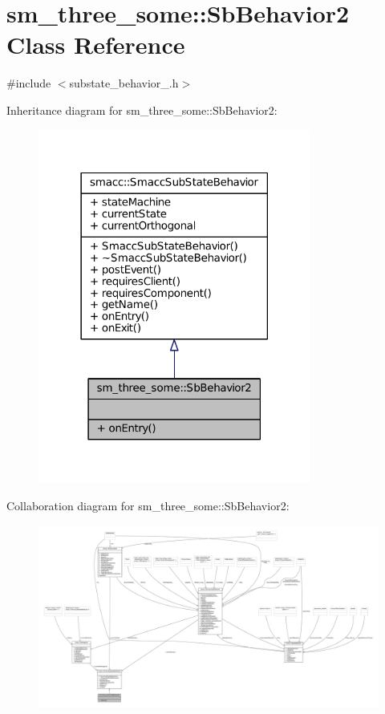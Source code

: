 \hypertarget{classsm__three__some_1_1SbBehavior2}{}\section{sm\+\_\+three\+\_\+some\+:\+:Sb\+Behavior2 Class Reference}
\label{classsm__three__some_1_1SbBehavior2}


{\ttfamily \#include $<$substate\+\_\+behavior\+\_.\+h$>$}



Inheritance diagram for sm\+\_\+three\+\_\+some\+:\+:Sb\+Behavior2\+:
\nopagebreak
\begin{figure}[H]
\begin{center}
\leavevmode
\includegraphics[width=254pt]{classsm__three__some_1_1SbBehavior2__inherit__graph}
\end{center}
\end{figure}


Collaboration diagram for sm\+\_\+three\+\_\+some\+:\+:Sb\+Behavior2\+:
\nopagebreak
\begin{figure}[H]
\begin{center}
\leavevmode
\includegraphics[width=350pt]{classsm__three__some_1_1SbBehavior2__coll__graph}
\end{center}
\end{figure}

